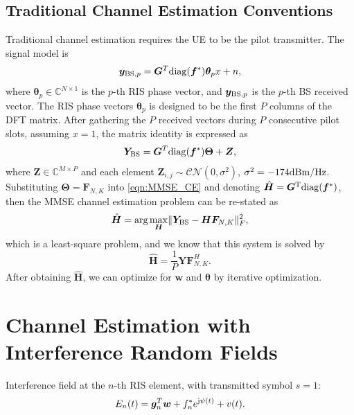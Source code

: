 \documentclass[12pt,draftclsnofoot,journal,onecolumn]{IEEEtran}
\theoremstyle{nonumberplain}
\def \arg {\text{arg}}
\def \CN {\mathcal{CN}}
\begin{document}
\subsection{Traditional Channel Estimation Conventions}
    Traditional channel estimation requires the UE to be the pilot transmitter. The signal model is 
    \begin{equation}
        {\bm y}_{{\rm BS}, p} = {\bm G}^{T} {\rm diag}({\bm f}^{*}) {\bm \theta}_p x+n, 
    \end{equation}
    where ${\bm \theta}_p \in \mathbb{C}^{N\times 1}$ is the $p$-th RIS phase vector, and ${\bm y}_{{\rm BS}, p}$ is the $p$-th  BS received vector. The RIS phase vectors ${\bm \theta}_p$ is designed to be the first $P$ columns of the DFT matrix. After gathering the $P$ received vectors during $P$ consecutive pilot slots, assuming $x=1$, the matrix identity is expressed as 
    \begin{equation}
        {\bm Y}_{\rm BS}={\bm G}^{T} {\rm diag}({\bm f}^{*}) {\bm \Theta} + {\bm Z}, 
        \label{eqn:MMSE_CE}
    \end{equation} 
    where ${\bm Z}\in \mathbb{C}^{M\times P}$ and each element ${\bm Z}_{i,j}\sim \CN(0,\sigma^2)$, $\sigma^2=-174{\rm dBm/Hz}$. 
    Substituting ${\bm \Theta} = {\bm F}_{N,K}$ into \eqref{eqn:MMSE_CE} and denoting $\hat{\bm H} = {\bm G}^{\rm T}{\rm diag}({\bm f}^{*})$, then the MMSE channel estimation problem can be re-stated as 
    \begin{equation}
        \hat{\bm H} = \arg\max_{\bm H} \lVert {\bm Y}_{\rm BS} - {\bm H} {\bm F}_{N,K}\rVert_{F}^2,
    \end{equation}
    which is a least-square problem, and we know that this system is solved by 
    \begin{equation}
        \hat{\bm H} = \frac{1}{P}{\bm Y}{\bm F}_{N,K}^{H}.
    \end{equation}
    After obtaining $\hat{\bm H}$, we can optimize for ${\bm w}$ and ${\bm \theta}$ by iterative optimization.

\section{Channel Estimation with Interference Random Fields}
Interference field at the $n$-th RIS element, with transmitted symbol $s=1$:
\begin{equation}
\label{interference}
E_{n}(t)=\bm g_{n}^{T}\bm w+f_{n}^{*}e^{{\rm j}\psi (t)}+v(t).
\end{equation}
\end{document}
